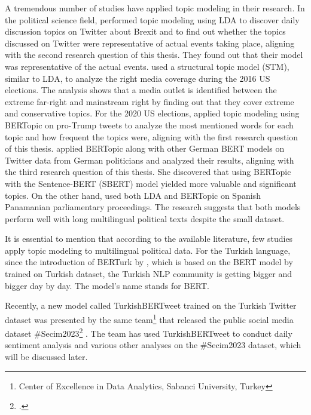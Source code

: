 A tremendous number of studies have applied topic modeling in their research. 
In the political science field, \textcite{ilyas_brexit_topic_modeling_2020} performed topic modeling 
using LDA to discover daily discussion topics on Twitter about Brexit and to find out whether 
the topics discussed on Twitter were representative of actual events taking place,
aligning with the second research question of this thesis.
They found out that their model was representative of the actual events.
\textcite{kaiser_right_media_USA_stm_topic_modeling_2020} used a structural topic model (STM), 
similar to LDA, to analyze the right media coverage during the 2016 US elections. 
The analysis shows that a media outlet is identified between the extreme far-right and 
mainstream right by finding out that they cover extreme and conservative topics.
For the 2020 US elections, \textcite{anwar_analyzing_twitter_BERT_QAnon_2021} applied 
topic modeling using BERTopic on pro-Trump tweets to analyze the most mentioned words for 
each topic and how frequent the topics were, aligning with the first research question of this thesis.
\textcite{bertopic_twitter_german_politics_2022} applied BERTopic along with other 
German BERT models on Twitter data from German politicians and analyzed their results,
aligning with the third research question of this thesis.
She discovered that using BERTopic with the Sentence-BERT (SBERT) model yielded more valuable and significant topics.
On the other hand, \textcite{contreras_panama_lda_bertopic_2022} used both LDA and BERTopic 
on Spanish Panamanian parliamentary proceedings. The research suggests that both 
models perform well with long multilingual political texts despite the small dataset. 

It is essential to mention that according to the available literature, few studies 
apply topic modeling to multilingual political data. For the Turkish language, 
since the introduction of BERTurk by \textcite{schweter_berturk_2020}, which is 
based on the BERT model by \textcite{devlin_bert_2019} trained on Turkish dataset,
the Turkish \ac{NLP} community is getting bigger and bigger day by day. 
The model's name stands for \ac{BERT}.

Recently, a new model called TurkishBERTweet trained on the Turkish Twitter dataset 
was presented by the same team\footnote{Center of Excellence in Data Analytics, Sabanci University, Turkey} 
that released the public social media dataset \#Secim2023\footcite{secim2023} \parencite{turkishbertweet_2023}. 
The team has used TurkishBERTweet to conduct daily sentiment analysis and 
various other analyses on the \#Secim2023 dataset, which will be discussed later.


